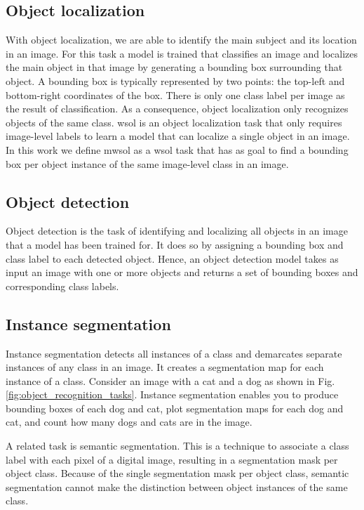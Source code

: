\subsection{Object localization}
With object localization, we are able to identify the main subject and its location in an image. For this task a model is trained that classifies an image and localizes the main object in that image by generating a bounding box surrounding that object. A bounding box is typically represented by two points: the top-left and bottom-right coordinates of the box. There is only one class label per image as the result of classification. As a consequence, object localization only recognizes objects of the same class. \acrfull{wsol} is an object localization task that only requires image-level labels to learn a model that can localize a single object in an image. In this work we define \acrfull{mwsol} as a \acrshort{wsol} task that has as goal to find a bounding box per object instance of the same image-level class in an image.

\subsection{Object detection}
Object detection is the task of identifying and localizing all objects in an image that a model has been trained for. It does so by assigning a bounding box and class label to each detected object. Hence, an object detection model takes as input an image with one or more objects and returns a set of bounding boxes and corresponding class labels.

\subsection{Instance segmentation}
Instance segmentation detects all instances of a class and demarcates separate instances of any class in an image. It creates a segmentation map for each instance of a class. Consider an image with a cat and a dog as shown in Fig. \ref{fig:object_recognition_tasks}. Instance segmentation enables you to produce bounding boxes of each dog and cat, plot segmentation maps for each dog and cat, and count how many dogs and cats are in the image.

A related task is semantic segmentation. This is a technique to associate a class label with each pixel of a digital image, resulting in a segmentation mask per object class. Because of the single segmentation mask per object class, semantic segmentation cannot make the distinction between object instances of the same class.

